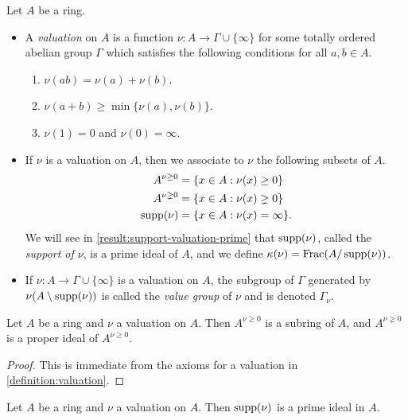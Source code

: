 \begin{definition}
\label{definition:valuation}
Let $A$ be a ring. 
\begin{itemize}
\item A \emph{valuation} on $A$ is a function $\nu : A \to \Gamma \cup \{\infty\}$ for some totally ordered abelian group $\Gamma$ which satisfies the following conditions for all $a, b \in A$. 
\begin{enumerate}[label=(\arabic{*})]
\item $\nu(ab) = \nu(a) + \nu(b)$. 
\item $\nu(a + b) \geq \min\{\nu(a), \nu(b)\}$. 
\item $\nu(1) = 0$ and $\nu(0) = \infty$. 
\end{enumerate}

\item If $\nu$ is a valuation on $A$, then we associate to $\nu$ the following subsets of $A$. 
\[ \begin{aligned} A^{\nu \geq 0} &= \{ x \in A : \nu(x) \geq 0\} \\
A^{\nu \gneq 0} &= \{ x \in A : \nu(x) \gneq 0 \} \\
\operatorname{supp}(\nu) &= \{ x \in A : \nu(x) = \infty \}. \end{aligned} \]
We will see in \cref{result:support-valuation-prime} that $\operatorname{supp}(\nu)$, called the \emph{support of $\nu$}, is a prime ideal of $A$, and we define $\kappa(\nu) = \operatorname{Frac}(A/\operatorname{supp}(\nu))$. 

\item If $\nu : A \to \Gamma \cup \{\infty\}$ is a valuation on $A$, the subgroup of $\Gamma$ generated by $\nu(A \setminus \operatorname{supp}(\nu))$ is called the \emph{value group} of $\nu$ and is denoted $\Gamma_\nu$.
\end{itemize}
\end{definition}

\begin{lemma}
\label{result:positive-ring}
Let $A$ be a ring and $\nu$ a valuation on $A$. Then $A^{\nu \geq 0}$ is a subring of $A$, and $A^{\nu \gneq 0}$ is a proper ideal of $A^{\nu \geq 0}$. 
\end{lemma}

\begin{proof}
This is immediate from the axioms for a valuation in \cref{definition:valuation}.
\end{proof}

\begin{lemma}
\label{result:support-valuation-prime}
Let $A$ be a ring and $\nu$ a valuation on $A$. Then $\operatorname{supp}(\nu)$ is a prime ideal in $A$. 
\end{lemma}


